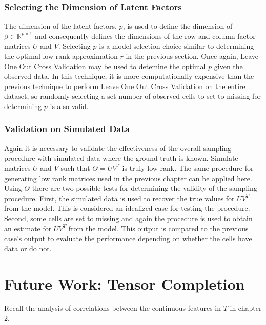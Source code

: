 \documentclass[12pt,twoside]{dukestatscithesis}
\theoremstyle{definition}
\theoremstyle{definition}
\theoremstyle{definition}
\theoremstyle{remark}
\begin{document}
\subsection{Selecting the Dimension of Latent
Factors}\label{selecting-the-dimension-of-latent-factors}

The dimension of the latent factors, \(p\), is used to define the
dimension of \(\beta \in \mathbb{R}^{p \times 1}\) and consequently
defines the dimensions of the row and column factor matrices \(U\) and
\(V\). Selecting \(p\) is a model selection choice similar to
determining the optimal low rank approximation \(r\) in the previous
section. Once again, Leave One Out Cross Validation may be used to
detemine the optimal \(p\) given the observed data. In this technique,
it is more computationally expensive than the previous technique to
perform Leave One Out Cross Validation on the entire dataset, so
randomly selecting a set number of observed cells to set to missing for
determining \(p\) is also valid.

\subsection{Validation on Simulated
Data}\label{validation-on-simulated-data}

Again it is necessary to validate the effectiveness of the overall
sampling procedure with simulated data where the ground truth is known.
Simulate matrices \(U\) and \(V\) such that \(\Theta = UV^T\) is truly
low rank. The same procedure for generating low rank matrices used in
the previous chapter can be applied here. Using \(\Theta\) there are two
possible tests for determining the validity of the sampling procedure.
First, the simulated data is used to recover the true values for
\(UV^T\) from the model. This is considered an idealized case for
testing the procedure. Second, some cells are set to missing and again
the procedure is used to obtain an estimate for \(UV^T\) from the model.
This output is compared to the previous case's output to evaluate the
performance depending on whether the cells have data or do not.

\chapter{Future Work: Tensor
Completion}\label{future-work-tensor-completion}

Recall the analysis of correlations between the continuous features in
\(T\) in chapter 2.
\end{document}
